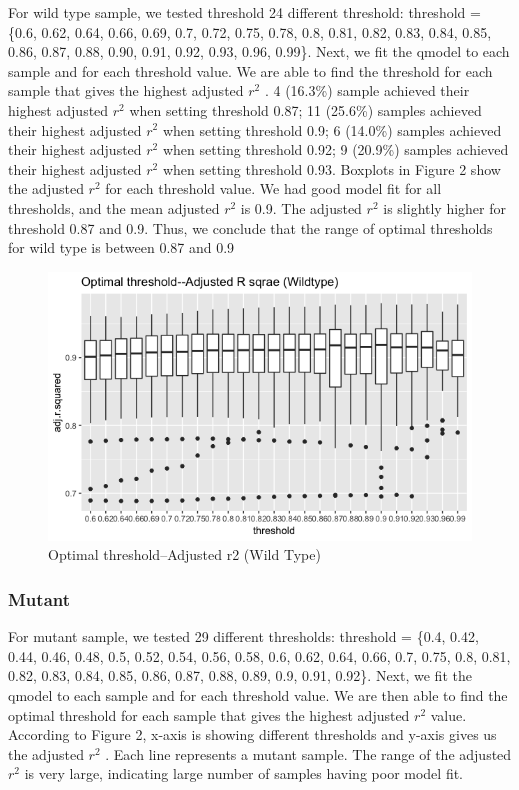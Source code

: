 \documentclass[10pt,letterpaper]{article}
\begin{document}
For wild type sample, we tested threshold 24 different threshold:
threshold = \{0.6, 0.62, 0.64, 0.66, 0.69, 0.7, 0.72, 0.75, 0.78, 0.8,
0.81, 0.82, 0.83, 0.84, 0.85, 0.86, 0.87, 0.88, 0.90, 0.91, 0.92, 0.93,
0.96, 0.99\}. Next, we fit the qmodel to each sample and for each
threshold value. We are able to find the threshold for each sample that
gives the highest adjusted \(r^2\) . 4 (16.3\%) sample achieved their
highest adjusted \(r^2\) when setting threshold 0.87; 11 (25.6\%)
samples achieved their highest adjusted \(r^2\) when setting threshold
0.9; 6 (14.0\%) samples achieved their highest adjusted \(r^2\) when
setting threshold 0.92; 9 (20.9\%) samples achieved their highest
adjusted \(r^2\) when setting threshold 0.93. Boxplots in Figure 2 show
the adjusted \(r^2\) for each threshold value. We had good model fit for
all thresholds, and the mean adjusted \(r^2\) is 0.9. The adjusted
\(r^2\) is slightly higher for threshold 0.87 and 0.9. Thus, we conclude
that the range of optimal thresholds for wild type is between 0.87 and
0.9

\begin{figure}[H]
\includegraphics[width=0.9\linewidth]{visualization_paper/threshold_boxplot_wt} \caption{Optimal threshold--Adjusted r2 (Wild Type)}\label{fig:Figure2}
\end{figure}

\hypertarget{mutant}{%
\subsubsection{Mutant}\label{mutant}}

For mutant sample, we tested 29 different thresholds: threshold = \{0.4,
0.42, 0.44, 0.46, 0.48, 0.5, 0.52, 0.54, 0.56, 0.58, 0.6, 0.62, 0.64,
0.66, 0.7, 0.75, 0.8, 0.81, 0.82, 0.83, 0.84, 0.85, 0.86, 0.87, 0.88,
0.89, 0.9, 0.91, 0.92\}. Next, we fit the qmodel to each sample and for
each threshold value. We are then able to find the optimal threshold for
each sample that gives the highest adjusted \(r^2\) value. According to
Figure 2, x-axis is showing different thresholds and y-axis gives us the
adjusted \(r^2\) . Each line represents a mutant sample. The range of
the adjusted \(r^2\) is very large, indicating large number of samples
having poor model fit.
\end{document}
